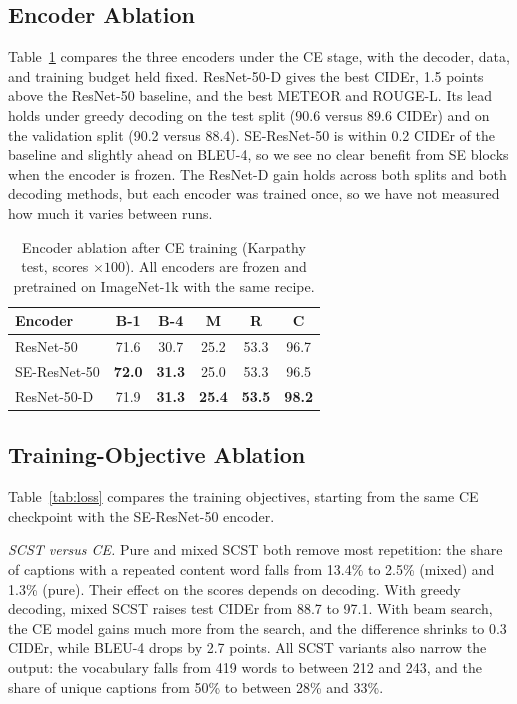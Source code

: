 \documentclass[conference]{IEEEtran}
\begin{document}
\subsection{Encoder Ablation}
Table~\ref{tab:encoder} compares the three encoders under the CE stage, with the
decoder, data, and training budget held fixed. ResNet-50-D gives the best
CIDEr, 1.5 points above the ResNet-50 baseline, and the best METEOR and
ROUGE-L. Its lead holds under greedy decoding on the test split (90.6 versus
89.6 CIDEr) and on the validation split (90.2 versus 88.4). SE-ResNet-50 is
within 0.2 CIDEr of the baseline and slightly ahead on BLEU-4, so we see no
clear benefit from SE blocks when the encoder is frozen. The ResNet-D gain
holds across both splits and both decoding methods, but each encoder was
trained once, so we have not measured how much it varies between runs.

\begin{table}[t]
\caption{Encoder ablation after CE training (Karpathy test, scores $\times100$).
All encoders are frozen and pretrained on ImageNet-1k with the same recipe.}
\label{tab:encoder}
\centering
\setlength{\tabcolsep}{4pt}
\begin{tabular}{@{}lccccc@{}}
\toprule
Encoder & B-1 & B-4 & M & R & C \\
\midrule
ResNet-50 & 71.6 & 30.7 & 25.2 & 53.3 & 96.7 \\
SE-ResNet-50 & \textbf{72.0} & \textbf{31.3} & 25.0 & 53.3 & 96.5 \\
ResNet-50-D & 71.9 & \textbf{31.3} & \textbf{25.4} & \textbf{53.5} & \textbf{98.2} \\
\bottomrule
\end{tabular}
\end{table}

\subsection{Training-Objective Ablation}
Table~\ref{tab:loss} compares the training objectives, starting from the same
CE checkpoint with the SE-ResNet-50 encoder.

\textit{SCST versus CE.} Pure and mixed SCST both remove most repetition: the
share of captions with a repeated content word falls from 13.4\% to 2.5\%
(mixed) and 1.3\% (pure). Their effect on the scores depends on decoding. With
greedy decoding, mixed SCST raises test CIDEr from 88.7 to 97.1. With beam
search, the CE model gains much more from
the search, and the difference shrinks to 0.3 CIDEr, while BLEU-4 drops by 2.7
points. All SCST variants also narrow the output: the vocabulary falls from 419
words to between 212 and 243, and the share of unique captions from 50\% to
between 28\% and 33\%.
\end{document}
